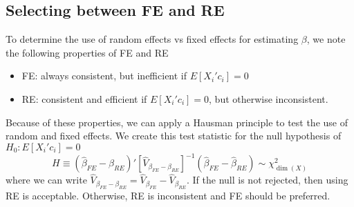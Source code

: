 \documentclass[12pt]{article}
\theoremstyle{definition}
\theoremstyle{property}
\theoremstyle{assumption}
\theoremstyle{example}
\theoremstyle{comment}
\newtheorem{comment}{Comment}[section]
\begin{document}
\begin{mdframed}[backgroundcolor=yellow!5] 
\begin{comment}[Between effects]
The expression $\bar{y}_i = \bar{x}_i'\beta+ c_i+\bar{e}_i$ is the grouped mean (over time) for the DGP $y_{it}=x_{it}'\beta+c_i+e_{it}$. From the group mean, we can get the between estimator that uses variation in the mean of each group $i$ around the overall mean.
\[
\hat{\beta}_{BE}=\left(\sum_{i=1}^n \bar{x}_i\bar{x}_i'\right)^{-1}\left(\sum_{i=1}^n \bar{x}_i\bar{y}_i\right)
\]
However, this is rarely in use because the within group variation is a lost information in this process, leading to inefficient estimates. Moreover, $c_i$ is not obliterated in the transformed DGP. So if $c_i$ is correlated with $x_{it}$, it is then naturally correlated with $\bar{x}_i$ and between effects estimate is inconsistent. 
\end{comment}
\end{mdframed}

\subsection{Selecting between FE and RE}
To determine the use of random effects vs fixed effects for estimating $\beta$, we note the following properties of FE and RE
\begin{itemize}
\item FE: always consistent, but inefficient if $E[X_i'c_i]=0$
\item RE: consistent and efficient if $E[X_i'c_i]=0$, but otherwise inconsistent. 
\end{itemize}
Because of these properties, we can apply a Hausman principle to test the use of random and fixed effects. We create this test statistic for the null hypothesis of $H_0:E[X_i'c_i]=0$
\[
H\equiv (\hat{\beta}_{FE}-\hat{\beta}_{RE})'[\widehat{V}_{\beta_{FE}-\beta_{RE}}]^{-1}(\hat{\beta}_{FE}-\hat{\beta}_{RE})\sim \chi^2_{\dim{(X)}}
\]
where we can write $\widehat{V}_{\beta_{FE}-\beta_{RE}}=\widehat{V}_{\beta_{FE}}-\widehat{V}_{\beta_{RE}}$. If the null is not rejected, then using RE is acceptable. Otherwise, RE is inconsistent and FE should be preferred.
\end{document}
